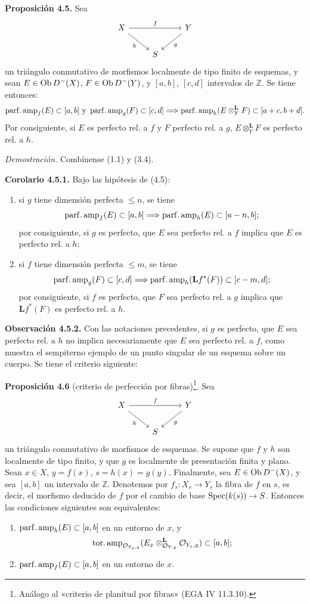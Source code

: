 \textbf{Proposición 4.5.} Sea
\[
\begin{tikzcd}
X \arrow[rr,"f"] \arrow[dr,"h"'] && Y \arrow[dl,"g"]\\
& S &
\end{tikzcd}
\]
un triángulo conmutativo de morfismos localmente de tipo finito de esquemas, y sean \(E\in\operatorname{Ob} D^-(X)\), \(F\in\operatorname{Ob} D^-(Y)\), y \([a,b]\), \([c,d]\) intervalos de \(\mathbb Z\). Se tiene entonces:
\[
 \operatorname{parf.amp}_f(E)\subset[a,b]\text{ y }\operatorname{parf.amp}_g(F)\subset[c,d]
 \Longrightarrow
 \operatorname{parf.amp}_h(E\otimes_Y^{\mathbf L}F)
 \subset[a+c,b+d].
\]
Por consiguiente, si \(E\) es perfecto rel. a \(f\) y \(F\) perfecto rel. a \(g\), \(E\otimes_Y^{\mathbf L}F\) es perfecto rel. a \(h\).

\emph{Demostración.} Combínense (1.1) y (3.4).

\textbf{Corolario 4.5.1.} Bajo las hipótesis de (4.5):
\begin{enumerate}[label=\alph*)]
\item si \(g\) tiene dimensión perfecta \(\leq n\), se tiene
\[
 \operatorname{parf.amp}_f(E)
 \subset[a,b]
 \Longrightarrow
 \operatorname{parf.amp}_h(E)
 \subset[a-n,b];
\]
por consiguiente, si \(g\) es perfecto, que \(E\) sea perfecto rel. a \(f\) implica que \(E\) es perfecto rel. a \(h\);
\item si \(f\) tiene dimensión perfecta \(\leq m\), se tiene
\[
 \operatorname{parf.amp}_g(F)
 \subset[c,d]
 \Longrightarrow
 \operatorname{parf.amp}_h(\mathbf Lf^*(F))
 \subset[c-m,d];
\]
por consiguiente, si \(f\) es perfecto, que \(F\) sea perfecto rel. a \(g\) implica que \(\mathbf Lf^*(F)\) es perfecto rel. a \(h\).
\end{enumerate}

\textbf{Observación 4.5.2.} Con las notaciones precedentes, si \(g\) es perfecto, que \(E\) sea perfecto rel. a \(h\) no implica necesariamente que \(E\) sea perfecto rel. a \(f\), como muestra el sempiterno ejemplo de un punto singular de un esquema sobre un cuerpo. Se tiene el criterio siguiente:

\textbf{Proposición 4.6} (criterio de perfección por fibras)\footnote{Análogo al «criterio de planitud por fibras» (EGA IV 11.3.10).}. Sea
\[
\begin{tikzcd}
X \arrow[rr,"f"] \arrow[dr,"h"'] && Y \arrow[dl,"g"]\\
& S &
\end{tikzcd}
\]
un triángulo conmutativo de morfismos de esquemas. Se supone que \(f\) y \(h\) son localmente de tipo finito, y que \(g\) es localmente de presentación finita y plano. Sean \(x\in X\), \(y=f(x)\), \(s=h(x)=g(y)\). Finalmente, sea \(E\in\operatorname{Ob} D^-(X)\), y sea \([a,b]\) un intervalo de \(\mathbb Z\). Denotemos por \(f_s:X_s\to Y_s\) la fibra de \(f\) en \(s\), es decir, el morfismo deducido de \(f\) por el cambio de base \(\operatorname{Spec}(k(s))\to S\). Entonces las condiciones siguientes son equivalentes:
\begin{enumerate}[label=(\roman*)]
\item \(\operatorname{parf.amp}_h(E)\subset[a,b]\) en un entorno de \(x\), y
\[
 \operatorname{tor.amp}_{\mathcal O_{Y_s,y}}(E_x\otimes_{\mathcal O_{Y,y}}^{\mathbf L}\mathcal O_{Y_s,y})
 \subset[a,b];
\]
\item \(\operatorname{parf.amp}_f(E)\subset[a,b]\) en un entorno de \(x\).
\end{enumerate}

